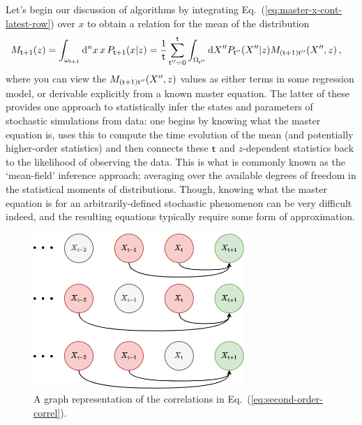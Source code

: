 Let's begin our discussion of algorithms by integrating Eq.~(\ref{eq:master-x-cont-latest-row}) over $x$ to obtain a relation for the mean of the distribution
\begin{align}
M_{{\sf t}+1}(z) &= \int_{\omega_{{\sf t}+1}}{\rm d}^nx \,x\, P_{{\sf t}+1}(x\vert z) = \frac{1}{{\sf t}}\sum_{{\sf t}''=0}^{{\sf t}} \int_{\Omega_{{\sf t}''}}{\rm d}X'' P_{{\sf t}''}(X''\vert z) M_{({\sf t}+1){\sf t}''}(X'',z) \label{eq:mean-field-master}\,,
\end{align}
where you can view the $M_{({\sf t}+1){\sf t}''}(X'',z)$ values as either terms in some regression model, or derivable explicitly from a known master equation. The latter of these provides one approach to statistically infer the states and parameters of stochastic simulations from data: one begins by knowing what the master equation is, uses this to compute the time evolution of the mean (and potentially higher-order statistics) and then connects these ${\sf t}$ and $z$-dependent statistics back to the likelihood of observing the data. This is what is commonly known as the `mean-field' inference approach; averaging over the available degrees of freedom in the statistical moments of distributions. Though, knowing what the master equation is for an arbitrarily-defined stochastic phenomenon can be very difficult indeed, and the resulting equations typically require some form of approximation. 

\begin{figure}[h]
\centering
\includegraphics[width=8cm]{images/chapter-2-second-temporal-correlation.drawio.png}
\caption{A graph representation of the correlations in Eq.~(\ref{eq:second-order-correl}).}
\label{fig:second-temporal-correlation}
\end{figure} 

